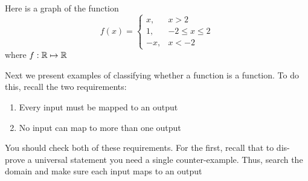 \documentclass[main.tex]{subfiles}
\begin{document}
\begin{example}
	Here is a graph of the function \[f(x) = \begin{cases} x, & x > 2 \\ 1, & -2 \leq x \leq 2 \\ -x, & x < -2 \end{cases}\] where \(f : \mathbb{R} \mapsto \mathbb{R}\)
	
	\begin{center}
	\end{center}
\end{example}

Next we present examples of classifying whether a function is a function. To do this, recall the two requirements:
\begin{enumerate}
	\item Every input must be mapped to an output
	\item No input can map to more than one output
\end{enumerate}
You should check both of these requirements. For the first, recall that to dis-prove a universal statement you need a single counter-example. Thus, search the domain and make sure each input maps to an output
\end{document}
